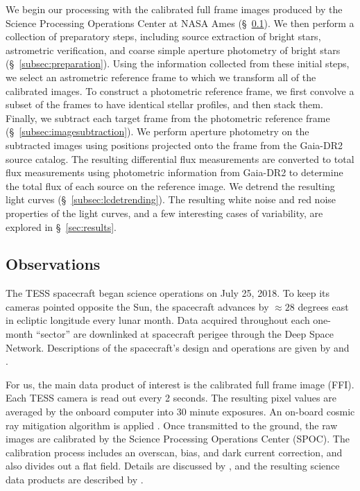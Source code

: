 \documentclass[12pt,twocolumn,tighten]{aastex62}
\begin{document}
We begin our processing with the calibrated full frame images produced
by the Science Processing Operations Center at NASA Ames
(\S~\ref{subsec:observations}).  We then perform a collection of
preparatory steps, including source extraction of bright stars,
astrometric verification, and coarse simple aperture photometry of
bright stars (\S~\ref{subsec:preparation}).  Using the information
collected from these initial steps, we select an astrometric reference
frame to which we transform all of the calibrated images.  To
construct a photometric reference frame, we first convolve a subset of
the frames to have identical stellar profiles, and then stack them.
Finally, we subtract each target frame from the photometric reference
frame (\S~\ref{subsec:imagesubtraction}).  We perform aperture
photometry on the subtracted images using positions projected onto the
frame from the Gaia-DR2 source catalog.  The resulting differential
flux measurements are converted to total flux measurements using
photometric information from Gaia-DR2 to determine the total flux of
each source on the reference image.  We detrend the resulting light
curves (\S~\ref{subsec:lcdetrending}).  The resulting white noise and
red noise properties of the light curves, and a few interesting cases
of variability, are explored in \S~\ref{sec:results}.


\subsection{Observations}
\label{subsec:observations}

The TESS spacecraft began science operations on July 25, 2018.  To
keep its cameras pointed opposite the Sun, the spacecraft advances by
$\approx$$28$ degrees east in ecliptic longitude every lunar month.
Data acquired throughout each one-month ``sector'' are downlinked at
spacecraft perigee through the Deep Space Network.  Descriptions of
the spacecraft's design and operations are given by
\citet{ricker_transiting_2015} and \citet{vanderspek_2018}.

For us, the main data product of interest is the calibrated full frame
image (FFI).  Each TESS camera is read out every 2 seconds.  The
resulting pixel values are averaged by the onboard computer into 30
minute exposures. An on-board cosmic ray mitigation algorithm is
applied \citep[][\S 5.1]{vanderspek_2018}. Once transmitted to the
ground, the raw images are calibrated by the Science Processing
Operations Center (SPOC).  The calibration process includes an
overscan, bias, and dark current correction, and also divides out a
flat field.  Details are discussed by \citet{clarke_kepler_2017}, and
the resulting science data products are described by
\citet{tess_data_product_description_2018}.
\end{document}
